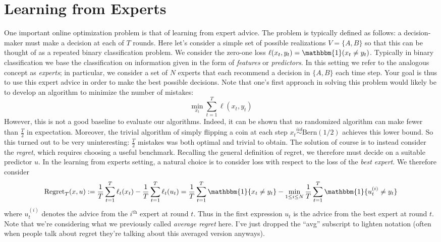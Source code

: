 \documentclass[12pt]{article}
\begin{document}
\section{Learning from Experts}
One important online optimization problem is that of learning from expert advice. The problem is typically defined as follows: a decision-maker must make a decision at each of $T$ rounds. Here let's 
consider a simple set of possible realizations $V = \{A, B\}$ so that this can be thought of as a repeated binary classification problem. We consider the zero-one loss 
$\ell(x_t, y_t) = \mathbbm{1}(x_t \neq y_t)$. Typically in binary classification we base the classification on information 
given in the form of \textit{features} or \textit{predictors}. In this setting we refer to the analogous concept as \textit{experts}; in particular, we consider a set of $N$ experts that each recommend a decision
in $\{A, B\}$ each time step. Your goal is thus to use this expert advice in order to make the best possible decisions. Note that one's first approach in solving this problem would likely be to develop an 
algorithm to minimize the number of mistakes: 
\[\min_{x_t} \sum_{t = 1}^{T} \ell(x_t, y_t)\]
However, this is not a good baseline to evaluate our algorithms. Indeed, it can be shown that no randomized algorithm can make fewer than $\frac{T}{2}$ in expectation. Moreover, the trivial algorithm 
of simply flipping a coin at each step $x_t \overset{iid}{\sim} \text{Bern}(1/2)$ achieves this lower bound. So this turned out to be very uninteresting: $\frac{T}{2}$ mistakes was both optimal and trivial 
to obtain. The solution of course is to instead consider the \textit{regret}, which requires choosing a useful benchmark. Recalling the general definition of regret, we therefore must decide on a suitable 
predictor $u$. In the learning from experts setting, a natural choice is to consider loss with respect to the loss of the \textit{best expert}. We therefore consider
\[\text{Regret}_T(x, u) := \frac{1}{T} \sum_{t = 1}^{T} \ell_t(x_t) - \frac{1}{T} \sum_{t = 1}^{T} \ell_t(u_t) = \frac{1}{T} \sum_{t = 1}^{T} \mathbbm{1}\{x_t \neq y_t\} - \min_{1 \leq i \leq N} \frac{1}{T} \sum_{t = 1}^{T} \mathbbm{1}\{u^{(i)}_t \neq y_t\}\]
where $u^{(i)}_t$ denotes the advice from the $i^{\text{th}}$ expert at round $t$. Thus in the first expression $u_t$ is the advice from the best expert at round $t$. Note that we're considering what we previously 
called \textit{average regret} here. I've just dropped the ``avg'' subscript to lighten notation (often when people talk about regret they're talking about this averaged version anyways). 
\end{document}
